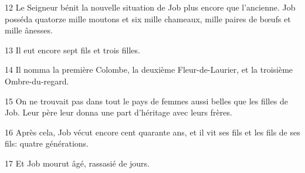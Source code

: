 
12 Le Seigneur bénit la nouvelle situation de Job plus encore que l’ancienne. Job posséda quatorze mille moutons et six mille chameaux, mille paires de bœufs et mille ânesses.

13 Il eut encore sept fils et trois filles.

14 Il nomma la première Colombe, la deuxième Fleur-de-Laurier, et la troisième Ombre-du-regard.

15 On ne trouvait pas dans tout le pays de femmes aussi belles que les filles de Job. Leur père leur donna une part d’héritage avec leurs frères.

16 Après cela, Job vécut encore cent quarante ans, et il vit ses fils et les fils de ses fils: quatre générations.

17 Et Job mourut âgé, rassasié de jours.